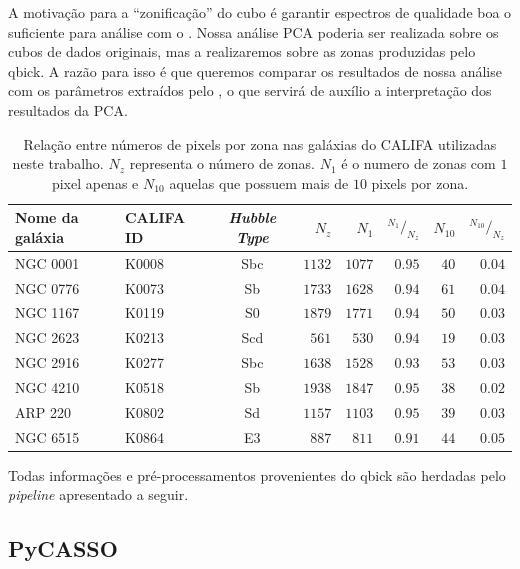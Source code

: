 A motivação para a ``zonificação'' do cubo é garantir espectros de qualidade boa o suficiente para análise com o
\starlight. Nossa análise PCA poderia ser realizada sobre os cubos de dados originais, mas a realizaremos sobre as zonas
produzidas pelo {\sc qbick}. A razão para isso é que queremos comparar os resultados de nossa análise com os parâmetros
extraídos pelo \starlight, o que servirá de auxílio a interpretação dos resultados da PCA.

\begin{table}
	\caption[Relação de pixels e zonas em algumas galáxias do CALIFA.]
	{Relação entre números de pixels por zona nas galáxias do CALIFA utilizadas neste trabalho. $N_z$ representa o número
	de zonas. $N_1$ é o numero de zonas com $1$ pixel apenas e $N_{10}$ aquelas que possuem mais de $10$ pixels por zona.}
	\begin{tabular}{l l c r r r r r}
		Nome da galáxia & CALIFA ID & {\em Hubble Type} & $N_z$ & $N_{1}$ &
		${}^{N_1}/_{N_z}$ & $N_{10}$ & ${}^{N_{10}}/_{N_z}$
		\\
		\midrule
		NGC 0001 & K0008 & Sbc & $1132$ & $1077$ & $0.95$ & $40$ & $0.04$ \\
		NGC 0776 & K0073 & Sb  & $1733$ & $1628$ & $0.94$ & $61$ & $0.04$ \\
		NGC 1167 & K0119 & S0  & $1879$ & $1771$ & $0.94$ & $50$ & $0.03$ \\
		NGC 2623 & K0213 & Scd & $561$  & $530$  & $0.94$ & $19$ & $0.03$ \\
		NGC 2916 & K0277 & Sbc & $1638$ & $1528$ & $0.93$ & $53$ & $0.03$ \\
		NGC 4210 & K0518 & Sb  & $1938$ & $1847$ & $0.95$ & $38$ & $0.02$ \\
		ARP 220  & K0802 & Sd  & $1157$ & $1103$ & $0.95$ & $39$ & $0.03$ \\
		NGC 6515 & K0864 & E3  & $887$  & $811$  & $0.91$ & $44$ & $0.05$ \\
	\end{tabular}
	\label{tab:pixelZones}
\end{table}

Todas informações e pré-processamentos provenientes do {\sc qbick} são herdadas pelo {\em pipeline} apresentado a
seguir.

\subsection{PyCASSO}

